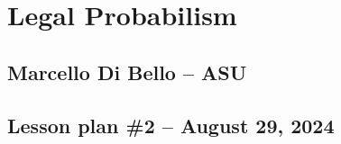 \documentclass[16pt]{article}
\begin{document}

\thispagestyle{empty}

\vspace{-2cm}
\noindent
\section*{\Large Legal Probabilism} 
\subsection*{Marcello Di Bello -- ASU}
\subsection*{Lesson plan \#2 -- August 29, 2024}

\vspace{5mm}
\end{document}
